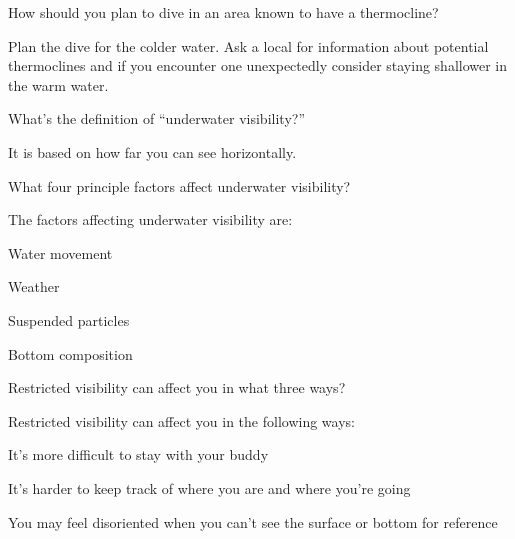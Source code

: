 	\begin{qanda}
		\begin{question}
How should you plan to dive in an area known to have a thermocline?
		\end{question}

		\begin{answer}
Plan the dive for the colder water.  Ask a local for information about potential thermoclines and if you encounter one unexpectedly consider staying shallower in the warm water.
		\end{answer}
	\end{qanda}

	\begin{qanda}
		\begin{question}
What's the definition of ``underwater visibility?''
		\end{question}

		\begin{answer}
It is based on how far you can see horizontally.
		\end{answer}
	\end{qanda}

	\begin{qanda}
		\begin{question}
What four principle factors affect underwater visibility?
		\end{question}

		\begin{answer}
The factors affecting underwater visibility are:
			\begin{nospacenumberedlist}
				\item Water movement
				\item Weather
				\item Suspended particles
				\item Bottom composition
			\end{nospacenumberedlist}
		\end{answer}
	\end{qanda}

	\begin{qanda}
		\begin{question}
Restricted visibility can affect you in what three ways?
		\end{question}

		\begin{answer}
Restricted visibility can affect you in the following ways:
			\begin{nospacebulletedlist}
				\item It's more difficult to stay with your buddy
				\item It's harder to keep track of where you are and where you're going
				\item You may feel disoriented when you can't see the surface or bottom for reference
			\end{nospacebulletedlist}%
		\end{answer}%
	\end{qanda}%

